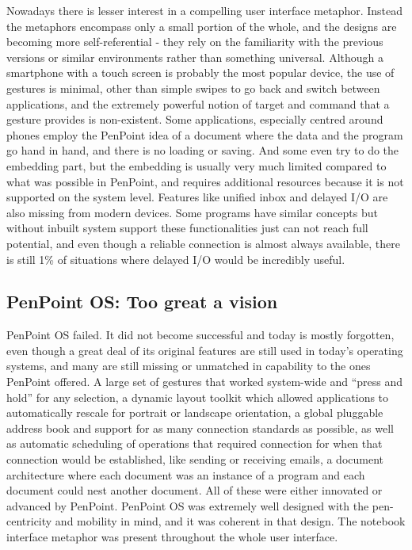 Nowadays there is lesser interest in a compelling user interface metaphor.
Instead the metaphors encompass only a small portion of the whole, and the
designs are becoming more self-referential - they rely on the familiarity with
the previous versions or similar environments rather than something universal.
Although a smartphone with a touch screen is probably the most popular device,
the use of gestures is minimal, other than simple swipes to go back and switch
between applications, and the extremely powerful notion of target and command
that a gesture provides is non-existent. Some applications, especially centred
around phones employ the PenPoint idea of a document where the data and the
program go hand in hand, and there is no loading or saving. And some even try
to do the embedding part, but the embedding is usually very much limited
compared to what was possible in PenPoint, and requires additional resources
because it is not supported on the system level. Features like unified inbox
and delayed I/O are also missing from modern devices. Some programs have
similar concepts but without inbuilt system support these functionalities just
can not reach full potential, and even though a reliable connection is almost
always available, there is still 1\% of situations where delayed I/O would be
incredibly useful.

\subsection{PenPoint OS: Too great a vision}

PenPoint OS failed. It did not become successful and today is mostly forgotten,
even though a great deal of its original features are still used in today's
operating systems, and many are still missing or unmatched in capability to the
ones PenPoint offered. A large set of gestures that worked system-wide and
``press and hold'' for any selection, a dynamic layout toolkit which allowed
applications to automatically rescale for portrait or landscape orientation,
a global pluggable address book and support for as many connection standards as
possible, as well as automatic scheduling of operations that required
connection for when that connection would be established, like sending or
receiving emails, a document architecture where each document was an instance
of a program and each document could nest another document. All of these were
either innovated or advanced by PenPoint. PenPoint OS was extremely well
designed with the pen-centricity and mobility in mind, and it was coherent in
that design. The notebook interface metaphor was present throughout the whole
user interface.

